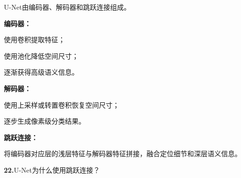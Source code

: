 \documentclass[UTF8,openany,oneside,zihao=-4,fontset=windows]{ctexbook}
\newif\ifshowsolutions
\newcommand{\Question}[2]{%
  \par\Needspace{4\baselineskip}\medskip
  \noindent\textbf{\color{MVBlue}#1}\quad #2\par
}
\newenvironment{AnswerBox}{\begin{tcolorbox}[breakable,colback=MVLight,colframe=MVBlue!45,title={参考答案},fonttitle=\bfseries,boxrule=0.55pt,arc=1.5mm,left=2mm,right=2mm,top=1.5mm,bottom=1.5mm]}{\end{tcolorbox}}
\newcommand{\PracticeSpace}[1]{\ifshowsolutions\else\par\vspace{#1}\par\fi}
\begin{document}
\begin{AnswerBox}
\par U-Net由编码器、解码器和跳跃连接组成。
\par\noindent\textbf{编码器：}
\par\noindent\textbullet\quad 使用卷积提取特征；
\par\noindent\textbullet\quad 使用池化降低空间尺寸；
\par 逐渐获得高级语义信息。
\par\noindent\textbf{解码器：}
\par\noindent\textbullet\quad 使用上采样或转置卷积恢复空间尺寸；
\par 逐步生成像素级分类结果。
\par\noindent\textbf{跳跃连接：}
\par 将编码器对应层的浅层特征与解码器特征拼接，融合定位细节和深层语义信息。
\end{AnswerBox}
\else
\PracticeSpace{2.4cm}
\fi
\Question{22.}{U-Net为什么使用跳跃连接？}
\ifshowsolutions
\begin{AnswerBox}
\par\noindent\textbf{编码器经过多次池化后：}
\par\noindent\textbullet\quad 语义信息增强；
\par\noindent\textbullet\quad 空间分辨率降低；
\par 目标边界和定位细节丢失。
\par\noindent\textbf{编码器浅层特征保留了丰富的：}
\par\noindent\textbullet\quad 边缘；
\par\noindent\textbullet\quad 纹理；
\par 空间位置信息。
\par 跳跃连接将浅层定位信息与解码器的高级语义特征融合，从而提高分割边界和小目标的恢复能力。
\end{AnswerBox}
\else
\PracticeSpace{2.4cm}
\fi
\end{document}
